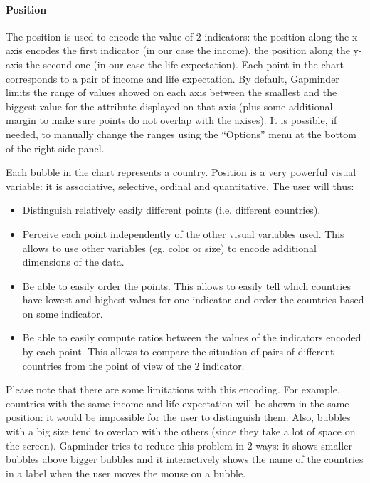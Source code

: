 \paragraph{Position}
The position is used to encode the value of $2$ indicators:
the position along the x-axis encodes the first indicator (in our case the income), the position along the y-axis the second one (in our case the life expectation).
Each point in the chart corresponds to a pair of income and life expectation.
By default, Gapminder limits the range of values showed on each axis between the smallest and the biggest value for the attribute displayed on that axis (plus some additional margin to make sure points do not overlap with the axises).
It is possible, if needed, to manually change the ranges using the ``Options'' menu at the bottom of the right side panel.

Each bubble in the chart represents a country.
Position is a very powerful visual variable: it is associative, selective, ordinal and quantitative.
The user will thus:
\begin{itemize}
    \item Distinguish relatively easily different points (i.e. different countries).
    \item Perceive each point independently of the other visual variables used. This allows to use other variables (eg. color or size) to encode additional dimensions of the data.
    \item Be able to easily order the points. This allows to easily tell which countries have lowest and highest values for one indicator and order the countries based on some indicator.
    \item Be able to easily compute ratios between the values of the indicators encoded by each point. This allows to compare the situation of pairs of different countries from the point of view of the $2$ indicator.
\end{itemize}

Please note that there are some limitations with this encoding.
For example, countries with the same income and life expectation will be shown in the same position:
it would be impossible for the user to distinguish them.
Also, bubbles with a big size tend to overlap with the others (since they take a lot of space on the screen).
Gapminder tries to reduce this problem in $2$ ways:
it shows smaller bubbles above bigger bubbles and it interactively shows the name of the countries in a label when the user moves the mouse on a bubble.

